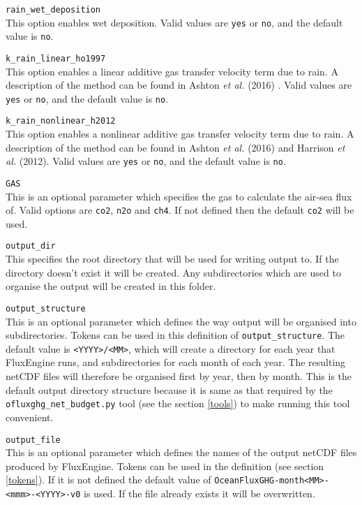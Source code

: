 \documentclass[]{scrartcl}
\newcommand{\conflistingsep}{\vspace{0.40cm}}
\begin{document}
\conflistingsep \noindent \texttt{rain\_wet\_deposition}\\
This option enables wet deposition. Valid values are \texttt{yes} or \texttt{no}, and the default value is \texttt{no}.

\conflistingsep \noindent \texttt{k\_rain\_linear\_ho1997}\\
This option enables a linear additive gas transfer velocity term due to rain. A description of the method can be found in Ashton \textit{et al.} (2016) . Valid values are \texttt{yes} or \texttt{no}, and the default value is \texttt{no}. %

\conflistingsep \noindent \texttt{k\_rain\_nonlinear\_h2012}\\
This option enables a nonlinear additive gas transfer velocity term due to rain. A description of the method can be found in Ashton \textit{et al.} (2016) and Harrison \textit{et al.} (2012). Valid values are \texttt{yes} or \texttt{no}, and the default value is \texttt{no}.

\conflistingsep \noindent \texttt{GAS}\\
This is an optional parameter which specifies the gas to calculate the air-sea flux of. Valid options are \texttt{co2}, \texttt{n2o} and \texttt{ch4}. If not defined then the default \texttt{co2} will be used.

\conflistingsep \noindent \texttt{output\_dir}\\
This specifies the root directory that will be used for writing output to. If the directory doesn't exist it will be created. Any subdirectories which are used to organise the output will be created in this folder.

\conflistingsep \noindent \texttt{output\_structure}\\
This is an optional parameter which defines the way output will be organised into subdirectories. Tokens can be used in this definition of \texttt{output\_structure}. The default value is \texttt{<YYYY>/<MM>}, which will create a directory for each year that FluxEngine runs, and subdirectories for each month of each year. The resulting netCDF files will therefore be organised first by year, then by month. This is the default output directory structure because it is same as that required by the \texttt{ofluxghg\_net\_budget.py} tool (see the section \ref{tools}) to make running this tool convenient.

\conflistingsep \noindent \texttt{output\_file}\\
This is an optional parameter which defines the names of the output netCDF files produced by FluxEngine. Tokens can be used in the definition (see section \ref{tokens}). If it is not defined the default value of \texttt{OceanFluxGHG-month<MM>-<mmm>-<YYYY>-v0} is used. If the file already exists it will be overwritten.
\end{document}
